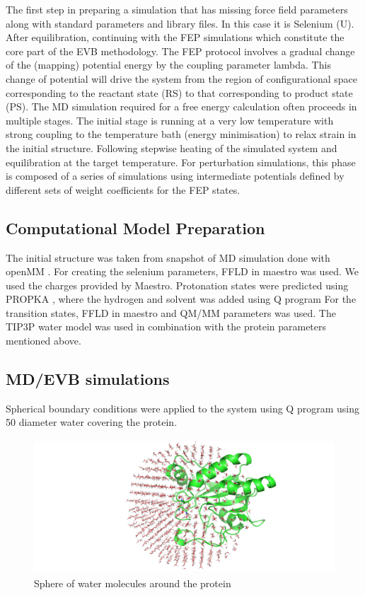 \documentclass[journal=jacsat,manuscript=article]{achemso}
\begin{document}
{The first step in preparing a simulation that has missing force field parameters along with standard parameters and library files. In this case it is Selenium (U). After equilibration, continuing with the FEP simulations which constitute the core part of the EVB methodology. The FEP protocol involves a gradual change of the (mapping) potential energy by the coupling parameter lambda. This change of potential will drive the system from the region of configurational space corresponding to the reactant state (RS) to that corresponding to product state (PS). The MD simulation required for a free energy calculation often proceeds in multiple stages. The initial stage is running at a very low temperature with strong coupling to the temperature bath (energy minimisation) to relax strain in the initial structure. Following stepwise heating of the simulated system and equilibration at the target temperature. For perturbation simulations, this phase is composed of a series of simulations using intermediate potentials defined by different sets of weight coefficients for the FEP states.

\subsection{Computational Model Preparation}

The initial structure was taken from snapshot of MD simulation done with openMM \cite{Eastman2017}. For creating the selenium parameters, FFLD in maestro was used. We used the charges provided by Maestro. Protonation states were predicted using PROPKA \cite{Søndergaard2011}, where the hydrogen and solvent was added using Q program \cite{Marelius1999} For the transition states, FFLD in maestro and QM/MM parameters was used. The TIP3P water model was used in combination with the protein parameters mentioned above.

\subsection {MD/EVB simulations}

Spherical boundary conditions \cite{King1989} were applied to the system using Q program \cite{Marelius1999} using 50 \text{\AA} diameter water covering the protein.

\begin{figure}
\begin{center}
\includegraphics[width=0.7\linewidth, height=5cm]{figures/solvent_sphere.png} 
\end{center}
\caption{Sphere of water molecules around the protein}
\label{fig:figure6}
\end{figure}

}
\end{document}
